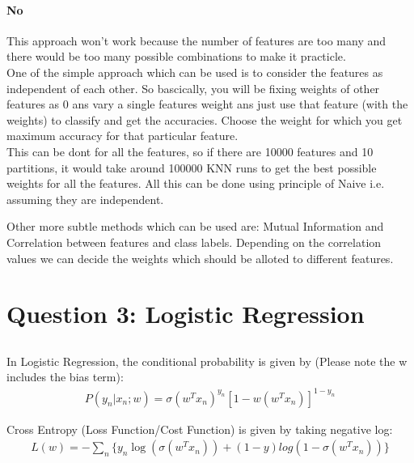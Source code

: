 \documentclass[paper=a4, fontsize=11pt]{scrartcl} %
\numberwithin{equation}{section} %
\numberwithin{figure}{section} %
\numberwithin{table}{section} %
\begin{document}
\paragraph{No}
This approach won't work because the number of features are too many and there would be too many possible combinations to make it practicle.\\

One of the simple approach which can be used is to consider the features as independent of each other. So bascically, you will be fixing weights of other features as 0 ans vary a single features weight ans just use that feature (with the weights) to classify and get the accuracies. Choose the weight for which you get maximum accuracy for that particular feature. \\

This can be dont for all the features, so if there are 10000 features and 10 partitions, it would take around 100000 KNN runs to get the best possible weights for all the features. All this can be done using principle of Naive i.e. assuming they are independent.

Other more subtle methods which can be used are: Mutual Information and Correlation between features and class labels. Depending on the correlation values we can decide the weights which should be alloted to different features.


\section{Question 3: Logistic Regression}
\subsection{}

In Logistic Regression, the conditional probability is given by (Please note the w includes the bias term):
\begin{align*} 
P(y_{n}|x_{n};w) = \sigma(w^{T}x_{n})^{y_{n}}[1-w(w^{T}x_{n})]^{1-y_{n}}
\end{align*}

Cross Entropy (Loss Function/Cost Function) is given by taking negative log:
\begin{align} 
L(w) = - \sum_{n}\{ y_{n}\log(\sigma(w^{T}x_{n})) + (1-y)log(1-\sigma(w^{T}x_{n})) \}
\end{align}
\end{document}

